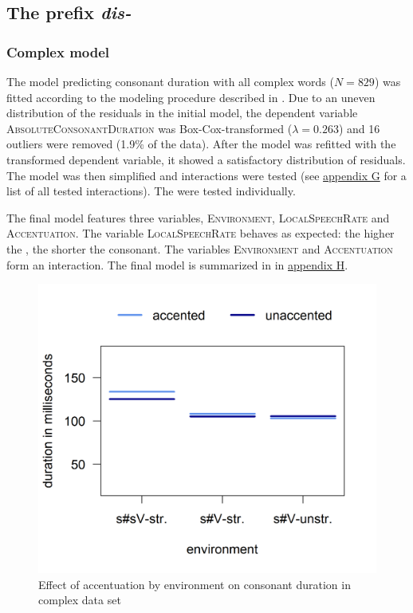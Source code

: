 \subsection{The prefix \textit{dis-} }


\subsubsection{Complex model}

The model predicting consonant duration with all complex words ($N=829$) was fitted according to the modeling procedure described in . Due to an uneven distribution of the residuals in the initial model, the dependent variable \textsc{AbsoluteConsonantDuration} was Box-Cox-transformed ($\lambda = 0.263$) and 16 outliers were removed (1.9\% of the data). After the model was refitted with the transformed dependent variable, it showed a satisfactory distribution of residuals. The model was then simplified and interactions were tested (see \hyperref[Appendix G Summaries of tested interactions in experimental study]{appendix G} for a list of all tested interactions). The  were tested individually.

The final model features three variables, \textsc{Environment}, \textsc{LocalSpeechRate} and \textsc{Accentuation}. The variable \textsc{LocalSpeechRate} behaves as expected: the higher the , the shorter the consonant. The variables \textsc{Environment} and \textsc{Accentuation} form an interaction. The final model is summarized in  in \hyperref[Appendix H: Model Summaries Experiment]{appendix H}.






\begin{figure}
	
	\includegraphics [scale=0.5] {images/Experiment/DisModelInterEnvAcc}
	\caption{Effect of accentuation by environment on consonant duration in complex data set}
	\label{fig:NumNasal disComplex experiment}
\end{figure}




